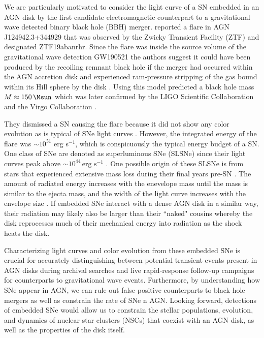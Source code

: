 We are particularly motivated to consider the light curve of a SN embedded in an AGN disk by the first candidate electromagnetic counterpart to a gravitational wave detected binary black hole (BBH) merger.
\citet{Graham+20} reported a flare in AGN J124942.3+344929 that was observed by the Zwicky Transient Facility (ZTF) and designated ZTF19abanrhr.
Since the flare was inside the source volume of the gravitational wave detection GW190521 \citep{Abbott+20-GW190521}
the authors suggest it could have been produced by the recoiling remnant black hole if the merger had occurred within the AGN accretion disk and experienced ram-pressure stripping of the gas bound within its Hill sphere by the disk \citep{McKernan+19}.
Using this model \citet{Graham+20} predicted a black hole mass $M\approx150\,\Msun$ which was later confirmed by the LIGO Scientific Collaboration and the Virgo Collaboration \citep{Abbott+20-GW190521}.


They dismissed a SN causing the flare because it did not show any color evolution as is typical of SNe light curves \citep{Foley+11}.
However, the integrated energy of the flare was $\sim10^{51}$ erg s$^{-1}$, which is conspicuously the typical energy budget of a SN.
One class of SNe are denoted as superluminous SNe (SLSNe) since their light curves peak above $\sim 10^{44}\,\text{erg s}^{-1}$ \citep{Gal-Yam12}.
One possible origin of these SLSNe is from stars that experienced extensive mass loss during their final years pre-SN \citep{Moriya+11}.
The amount of radiated energy increases with the enevelope mass until the mass is similar to the ejecta mass, and the width of the light curve increases with the envelope size \citep{GinzburgBalberg12}.
If embedded SNe interact with a dense AGN disk in a similar way, their radiation may likely also be larger than their ``naked" cousins whereby the disk reprocesses much of their mechanical energy into radiation as the shock heats the disk.

Characterizing light curves and color evolution from these embedded SNe is crucial for accurately distinguishing between potential transient events present in AGN disks during archival searches and live rapid-response follow-up campaigns for counterparts to gravitational wave events.
Furthermore, by understanding how SNe appear in AGN, we can rule out false positive counterparts to black hole mergers as well as constrain the rate of SNe n AGN.
Looking forward, detections of embedded SNe would allow us to constrain the stellar populations, evolution, and dynamics of nuclear star clusters (NSCs) that coexist with an AGN disk, as well as the properties of the disk itself.

